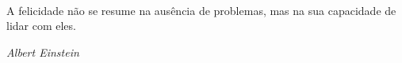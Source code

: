 \pretextualchapter{}

  \vfill\
  \begin{flushright}
    A felicidade não se resume na ausência de problemas, mas na sua capacidade de lidar com eles.

\textit{Albert Einstein}
  \end{flushright}